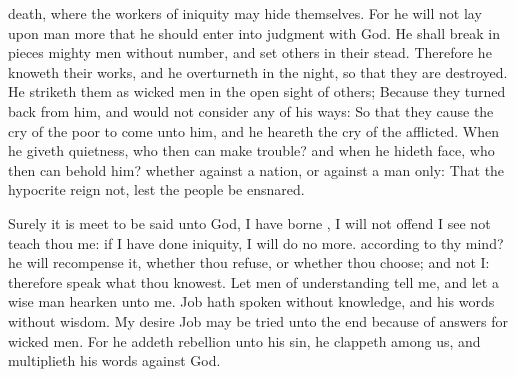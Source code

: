 {death, where the
workers of
iniquity may
hide themselves.
For he will not
lay upon
man more
{} that he should
enter into
judgment with
God.
He shall break in
pieces mighty
men without
number, and
set
others in their stead.
Therefore he
knoweth their
works, and he
overturneth
{} in the
night, so that they are
destroyed.
He
striketh them
as wicked
men in the
open
sight of others;
Because they turned
back from
him, and would not
consider any of his
ways:
So that they cause the
cry of the
poor to
come unto him, and he
heareth the
cry of the
afflicted.
When he giveth
quietness, who then can make
trouble? and when he
hideth
{}
face, who then can
behold him? whether
{} against a
nation, or against a
man
only:
That the
hypocrite
reign not, lest the
people be
ensnared.
\par }{\PP {}Surely it is meet to be
said unto
God, I have
borne
{}, I will not
offend
{}
 I
see
not
teach thou me: if I have
done
iniquity, I will
do no more.
 according to thy mind? he will
recompense it, whether thou
refuse, or whether thou
choose; and not I: therefore
speak what thou
knowest.
Let
men of
understanding
tell me, and let a
wise
man
hearken unto me.
Job hath
spoken without
knowledge, and his
words
{} without
wisdom.
My
desire
{}
Job may be
tried unto the
end because of
{}
answers for
wicked
men.
For he
addeth
rebellion unto his
sin, he
clappeth
{} among us, and
multiplieth his
words against
God.

}
